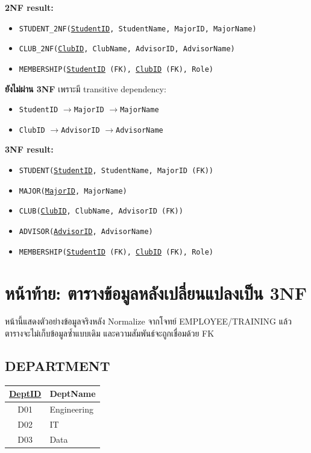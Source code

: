 \documentclass[a4paper,12pt]{article}
\newcommand{\pk}[1]{\uline{#1}}
\newcommand{\fd}{\(\rightarrow\)}
\newcommand{\schema}[1]{\texttt{#1}}
\begin{document}
\textbf{2NF result:}
\begin{itemize}
    \item \schema{STUDENT\_2NF(\pk{StudentID}, StudentName, MajorID, MajorName)}
    \item \schema{CLUB\_2NF(\pk{ClubID}, ClubName, AdvisorID, AdvisorName)}
    \item \schema{MEMBERSHIP(\pk{StudentID} (FK), \pk{ClubID} (FK), Role)}
\end{itemize}

\textbf{ยังไม่ผ่าน 3NF} เพราะมี transitive dependency:
\begin{itemize}
    \item \schema{StudentID} \fd \schema{MajorID} \fd \schema{MajorName}
    \item \schema{ClubID} \fd \schema{AdvisorID} \fd \schema{AdvisorName}
\end{itemize}

\textbf{3NF result:}
\begin{itemize}
    \item \schema{STUDENT(\pk{StudentID}, StudentName, MajorID (FK))}
    \item \schema{MAJOR(\pk{MajorID}, MajorName)}
    \item \schema{CLUB(\pk{ClubID}, ClubName, AdvisorID (FK))}
    \item \schema{ADVISOR(\pk{AdvisorID}, AdvisorName)}
    \item \schema{MEMBERSHIP(\pk{StudentID} (FK), \pk{ClubID} (FK), Role)}
\end{itemize}

\newpage
\section*{หน้าท้าย: ตารางข้อมูลหลังเปลี่ยนแปลงเป็น 3NF}
หน้านี้แสดงตัวอย่างข้อมูลจริงหลัง Normalize จากโจทย์ EMPLOYEE/TRAINING แล้ว ตารางจะไม่เก็บข้อมูลซ้ำแบบเดิม และความสัมพันธ์จะถูกเชื่อมด้วย FK

\subsection*{DEPARTMENT}
\begin{center}
\renewcommand{\arraystretch}{1.15}
\small
\begin{tabular}{|c|l|}
    \hline
    \rowcolor{cyan!15}
    \pk{DeptID} & DeptName \\
    \hline
    D01 & Engineering \\
    D02 & IT \\
    D03 & Data \\
    \hline
\end{tabular}
\end{center}
\end{document}
